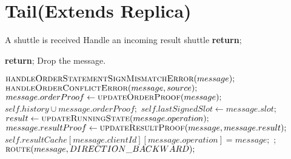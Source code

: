 \section{Tail(Extends Replica)}

\begin{algorithmic}[1]

\Require A shuttle is received
 \Comment Handle an incoming result shuttle
    	\State \textbf{return};
    \EndIf
	
		\State \textbf{return}; \Comment Drop the message.
	\EndIf
	
    	\State $\Call{handleOrderStatementSignMismatchError}{message};$
    	\State $\Call{handleOrderConflictError}{message, source};$
    \Else
    	\State $message.orderProof\gets \Call{updateOrderProof}{message};$
		\State $self.history \cup message.orderProof;$
		\State $self.lastSignedSlot\gets message.slot;$
        \State $result\gets \Call{updateRunningState}{message.operation};$ 
        \State $message.resultProof\gets \Call{updateResultProof}{message, message.result};$
        \State $self.resultCache[message.clientId][message.operation] = message;$
        \State {};
        \State $\Call{route}{message, DIRECTION\_BACKWARD};$
    \EndIf
\EndFunction
\\

\end{algorithmic}